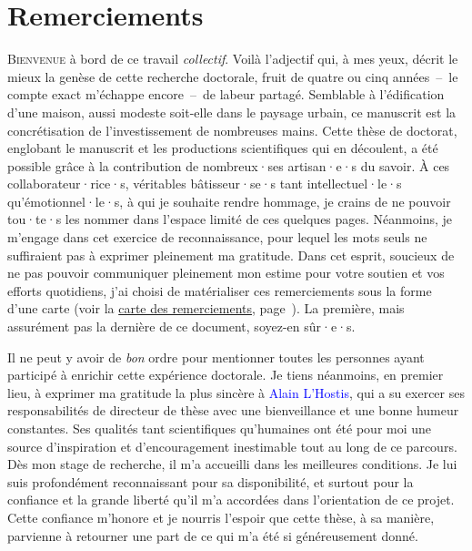 
    \cleardoublepage
\chapter*{Remerciements
    \label{body:remerciements}
    }

\lettrine[lines=3, findent=8pt, nindent=0pt]{ B}{ienvenue} à bord de ce travail \textsl{collectif}. Voilà l'adjectif qui, à mes yeux, décrit le mieux la genèse de cette recherche doctorale, fruit de quatre ou cinq années~–~le compte exact m'échappe encore~–~de labeur partagé. Semblable à l'édification d'une maison, aussi modeste soit-elle dans le paysage urbain, ce manuscrit est la concrétisation de l'investissement de nombreuses mains. Cette thèse de doctorat, englobant le manuscrit et les productions scientifiques qui en découlent, a été possible grâce à la contribution de nombreux·ses artisan·e·s du savoir. À ces collaborateur·rice·s, véritables bâtisseur·se·s tant intellectuel·le·s qu'émotionnel·le·s, à qui je souhaite rendre hommage, je crains de ne pouvoir tou·te·s les nommer dans l'espace limité de ces quelques pages. Néanmoins, je m'engage dans cet exercice de reconnaissance, pour lequel les mots seuls ne suffiraient pas à exprimer pleinement ma gratitude. Dans cet esprit, soucieux de ne pas pouvoir communiquer pleinement mon estime pour votre soutien et vos efforts quotidiens, j'ai choisi de matérialiser ces remerciements sous la forme d'une carte (voir la \hyperref[fig-introduction:remerciements]{carte des remerciements}, page~\pageref{fig-introduction:remerciements}). La première, mais assurément pas la dernière de ce document, soyez-en sûr·e·s.%

Il ne peut y avoir de \textsl{bon} ordre pour mentionner toutes les personnes ayant participé à enrichir cette expérience doctorale. Je tiens néanmoins, en premier lieu, à exprimer ma gratitude la plus sincère à \textcolor{blue}{Alain L'Hostis}, qui a su exercer ses responsabilités de directeur de thèse avec une bienveillance et une bonne humeur constantes. Ses qualités tant scientifiques qu'humaines ont été pour moi une source d'inspiration et d'encouragement inestimable tout au long de ce parcours. Dès mon stage de recherche, il m'a accueilli dans les meilleures conditions. Je lui suis profondément reconnaissant pour sa disponibilité, et surtout pour la confiance et la grande liberté qu'il m'a accordées dans l'orientation de ce projet. Cette confiance m'honore et je nourris l'espoir que cette thèse, à sa manière, parvienne à retourner une part de ce qui m'a été si généreusement donné.%

